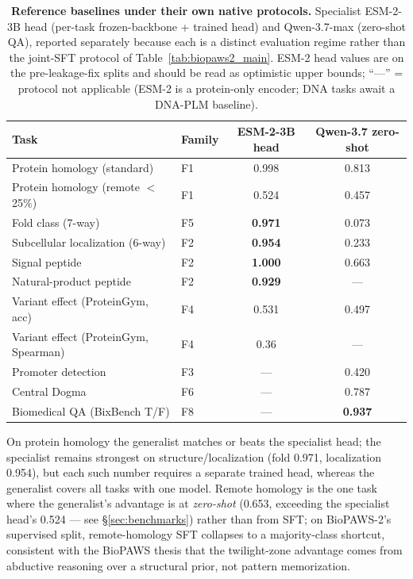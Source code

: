 \begin{table}[t]
\centering
\small
\caption{\textbf{Reference baselines under their own native protocols.} Specialist ESM-2-3B
head (per-task frozen-backbone + trained head) and Qwen-3.7-max (zero-shot QA), reported
separately because each is a distinct evaluation regime rather than the joint-SFT protocol
of Table~\ref{tab:biopaws2_main}. ESM-2 head values are on the pre-leakage-fix splits and
should be read as optimistic upper bounds; ``---'' = protocol not applicable (ESM-2 is a
protein-only encoder; DNA tasks await a DNA-PLM baseline).}
\label{tab:biopaws2_ref}
\begin{tabular}{llcc}
\toprule
Task & Family & ESM-2-3B head & Qwen-3.7 zero-shot \\
\midrule
Protein homology (standard)      & F1 & 0.998 & 0.813 \\
Protein homology (remote $<$25\%)& F1 & 0.524 & 0.457 \\
Fold class (7-way)               & F5 & \textbf{0.971} & 0.073 \\
Subcellular localization (6-way) & F2 & \textbf{0.954} & 0.233 \\
Signal peptide                   & F2 & \textbf{1.000} & 0.663 \\
Natural-product peptide          & F2 & \textbf{0.929} & --- \\
Variant effect (ProteinGym, acc) & F4 & 0.531 & 0.497 \\
Variant effect (ProteinGym, Spearman) & F4 & 0.36 & --- \\
Promoter detection               & F3 & --- & 0.420 \\
Central Dogma                    & F6 & --- & 0.787 \\
Biomedical QA (BixBench T/F)     & F8 & --- & \textbf{0.937} \\
\bottomrule
\end{tabular}
\end{table}

On protein homology the generalist matches or beats the specialist head; the specialist
remains strongest on structure/localization (fold 0.971, localization 0.954), but each such
number requires a separate trained head, whereas the generalist covers all tasks with one
model. Remote homology is the one task where the generalist's advantage is at
\emph{zero-shot} (0.653, exceeding the specialist head's 0.524 --- see \S\ref{sec:benchmarks})
rather than from SFT; on BioPAWS-2's supervised split, remote-homology SFT collapses to a
majority-class shortcut, consistent with the BioPAWS thesis that the twilight-zone advantage
comes from abductive reasoning over a structural prior, not pattern memorization.

